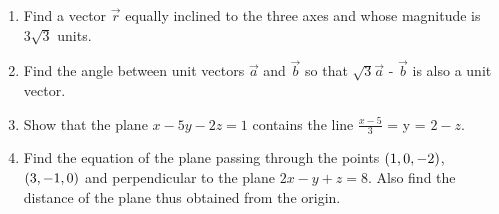 \begin{enumerate}
\item Find a vector $\overrightarrow{r}$ equally inclined to the three axes and whose magnitude is $3\sqrt{3}$ units.
\item Find the angle between unit vectors $\overrightarrow{a}$ and $\overrightarrow{b}$ so that $\sqrt{3}\overrightarrow{a}$ - $\overrightarrow{b}$ is also a unit vector.
\item Show that the plane $x - 5y - 2z = 1$ contains the line $\frac{x - 5}{3}$ = y = $2 -z$.
\item Find the equation of the plane passing through the points $\left(1, 0, -2\right)$,  $\left(3, -1, 0\right)$ and perpendicular to the plane $2x - y + z = 8$. Also find the distance of the plane thus obtained from the origin.
\end{enumerate}

